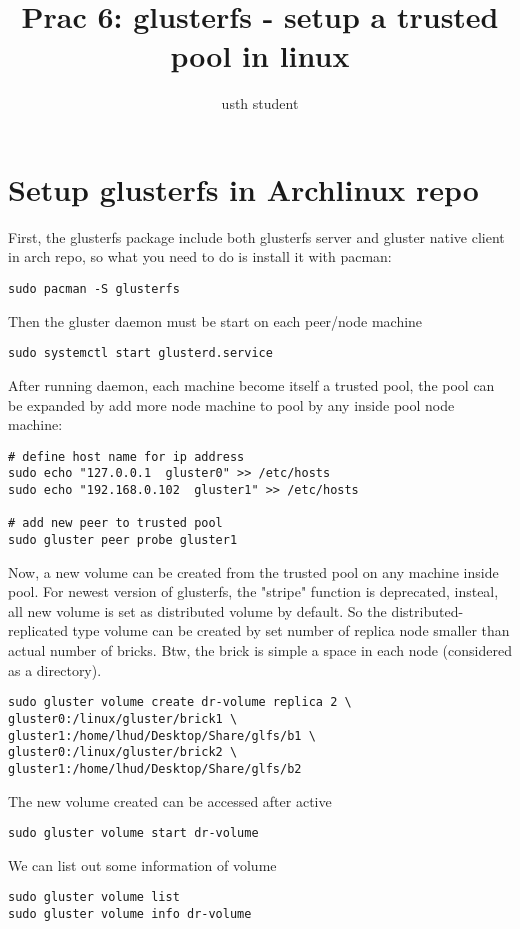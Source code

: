 \documentclass{article}
\title{Prac 6: glusterfs - setup a trusted pool in linux}
\author{usth student}
\begin{document}
\maketitle
\section{Setup glusterfs in Archlinux repo}
First, the glusterfs package include both glusterfs server and gluster native client in arch repo,
so what you need to do is install it with pacman:
\begin{verbatim}
sudo pacman -S glusterfs
\end{verbatim}

Then the gluster daemon must be start on each peer/node machine
\begin{verbatim}
sudo systemctl start glusterd.service
\end{verbatim}

After running daemon, each machine become itself a trusted pool, the pool can be expanded by add
more node machine to pool by any inside pool node machine:
\begin{verbatim}
# define host name for ip address
sudo echo "127.0.0.1  gluster0" >> /etc/hosts
sudo echo "192.168.0.102  gluster1" >> /etc/hosts

# add new peer to trusted pool
sudo gluster peer probe gluster1
\end{verbatim}

Now, a new volume can be created from the trusted pool on any machine inside pool. For newest version of
glusterfs, the "stripe" function is deprecated, insteal, all new volume is set as distributed volume
by default. So the distributed-replicated type volume can be created by set number of replica node smaller
than actual number of bricks. Btw, the brick is simple a space in each node (considered as a directory).
\begin{verbatim}
sudo gluster volume create dr-volume replica 2 \
gluster0:/linux/gluster/brick1 \
gluster1:/home/lhud/Desktop/Share/glfs/b1 \
gluster0:/linux/gluster/brick2 \
gluster1:/home/lhud/Desktop/Share/glfs/b2
\end{verbatim}

The new volume created can be accessed after active
\begin{verbatim}
sudo gluster volume start dr-volume
\end{verbatim}

We can list out some information of volume
\begin{verbatim}
sudo gluster volume list
sudo gluster volume info dr-volume
\end{verbatim}
\end{document}
